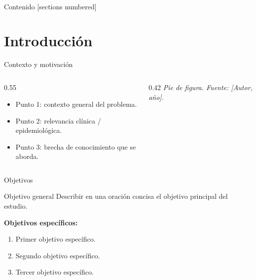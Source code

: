 \documentclass[aspectratio=169, 11pt]{beamer}
\begin{document}
\begin{frame}{Contenido}
  [sections numbered]
  \tableofcontents[hideallsubsections]
\end{frame}

\section{Introducción}

\begin{frame}{Contexto y motivación}
  \begin{columns}[T]
    \begin{column}{0.55\textwidth}
      \begin{itemize}
        \item Punto 1: contexto general del problema.
        \item Punto 2: relevancia clínica / epidemiológica.
        \item Punto 3: brecha de conocimiento que se aborda.
      \end{itemize}
    \end{column}
    \begin{column}{0.42\textwidth}
      \vspace{0.3em}
      {\footnotesize\textit{Pie de figura. Fuente: [Autor, año].}}
    \end{column}
  \end{columns}
\end{frame}

\begin{frame}{Objetivos}
  \begin{block}{Objetivo general}
    Describir en una oración concisa el objetivo principal del estudio.
  \end{block}

  \vspace{0.5em}
  \textbf{Objetivos específicos:}
  \begin{enumerate}
    \item Primer objetivo específico.
    \item Segundo objetivo específico.
    \item Tercer objetivo específico.
  \end{enumerate}
\end{frame}
\end{document}
